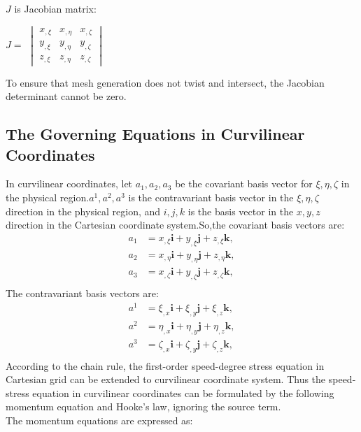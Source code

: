 $J$ is Jacobian matrix:
\begin{center}
$J = $	
$	\begin{vmatrix}
		x_{,\xi} & x_{,\eta} & x_{,\zeta}\\
		y_{,\xi} & y_{,\eta} & y_{,\zeta}\\
		z_{,\xi} & z_{,\eta} & z_{,\zeta}
	\end{vmatrix}$
\end{center}
To ensure that mesh generation does not twist and intersect, the Jacobian determinant cannot be zero.

\subsection{The Governing Equations in Curvilinear Coordinates}  
In curvilinear coordinates, let $ a_1, a_2, a_3$ be the covariant basis vector for $\xi,\eta,\zeta $ in the physical region.$ a^1, a^2, a^3$ is the contravariant basis vector in the $\xi,\eta,\zeta $ direction in the physical region, and $i, j, k$ is the basis vector in the $x, y, z $ direction in the Cartesian coordinate system.So,the covariant basis vectors are:
\begin{align}
	a_1 & = x_{,\xi} \bm{i} + y_{,\xi}\bm{j} + z_{,\xi}\bm{k} , \\
	a_2 & = x_{,\eta} \bm{i} + y_{,\eta}\bm{j} + z_{,\eta}\bm{k} , \\
	a_3 & = x_{,\zeta} \bm{i} + y_{,\zeta}\bm{j} + z_{,\zeta}\bm{k} , \\
\end{align}
The contravariant basis vectors are:
\begin{align}
 	a^1 & = \xi_{,x} \bm{i} + \xi_{,y}\bm{j} + \xi_{,z}\bm{k} , \\
 	a^2 & = \eta_{,x} \bm{i} + \eta_{,y}\bm{j} + \eta_{,z}\bm{k} , \\
 	a^3 & = \zeta_{,x} \bm{i} + \zeta_{,y}\bm{j} + \zeta_{,z}\bm{k} , \\
\end{align}
According to the chain rule, the first-order speed-degree stress equation in Cartesian grid can be extended to curvilinear coordinate system. Thus the speed-stress equation in curvilinear coordinates can be formulated by the following momentum equation and Hooke's law, ignoring the source term.\\
The momentum equations are expressed as:
